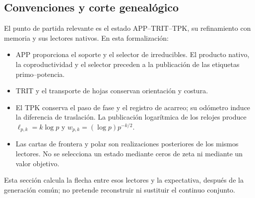 \subsection{Convenciones y corte genealógico}
\label{viii:gamma-add-sub-32}

El punto de partida relevante es el estado APP--TRIT--TPK, su refinamiento con memoria y sus lectores nativos. En esta formalización:

\begin{itemize}
\item APP proporciona el soporte y el selector de irreducibles. El producto nativo, la coproductividad y el selector preceden a la publicación de las etiquetas primo--potencia.
\item TRIT y el transporte de hojas conservan orientación y costura.
\item El TPK conserva el paso de fase y el registro de acarreo; su odómetro induce la diferencia de traslación. La publicación logarítmica de los relojes produce \(\ell_{p,k}=k\log p\) y \(w_{p,k}=(\log p)p^{-k/2}\).
\item Las cartas de frontera y polar son realizaciones posteriores de los mismos lectores. No se selecciona un estado mediante ceros de zeta ni mediante un valor objetivo.

\end{itemize}
Esta sección calcula la flecha entre esos lectores y la expectativa, después de la generación común; no pretende reconstruir ni sustituir el continuo conjunto.

